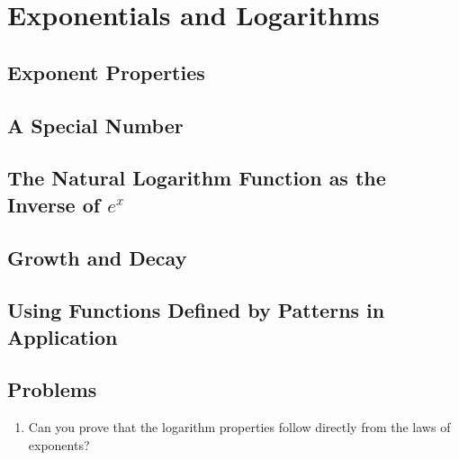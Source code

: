 \documentclass[../precalc.tex]{subfiles}
\begin{document}
\chapter{Exponentials and Logarithms}
\section{Exponent Properties}
\section{A Special Number}
\section{The Natural Logarithm Function as the Inverse of \texorpdfstring{$e^x$}{e to the x}}
\section{Growth and Decay}
\section{Using Functions Defined by Patterns in Application}

\section*{Problems}
\begin{enumerate}
    \item Can you prove that the logarithm properties follow directly from the laws of exponents?
\end{enumerate}
\end{document}
